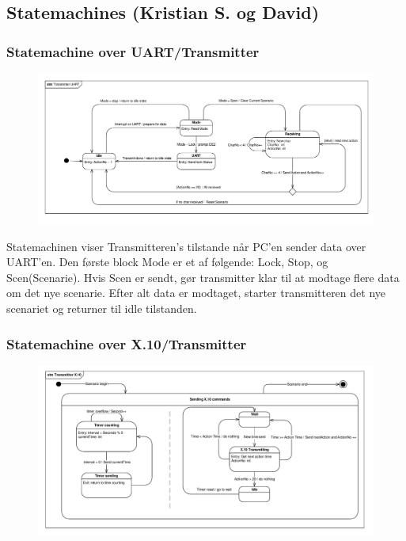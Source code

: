 \begin{landscape}
\section{Statemachines (Kristian S. og David)}

\subsubsection{Statemachine over UART/Transmitter }

\begin{figure}[h]
\centering
\includegraphics[width=\textheight + 190pt,clip=true, trim=18 18 10 18]{Systemarkitektur/diagrammer/Stm_transmitter_UART} %
\end{figure}

Statemachinen viser Transmitteren's tilstande når PC'en sender data over UART'en. Den første block Mode er et af følgende: Lock, Stop, og Scen(Scenarie). Hvis Scen er sendt, gør transmitter klar til at modtage flere data om det nye scenarie. Efter alt data er modtaget, starter transmitteren det nye scenariet og returner til idle tilstanden.

\newpage

\subsubsection{Statemachine over X.10/Transmitter }

\begin{figure}[h]
\centering
\includegraphics[width=\textheight + 190pt,clip=true, trim=18 15 18 12]{Systemarkitektur/diagrammer/Stm_transmitter_X10} %
\end{figure}


\end{landscape}
